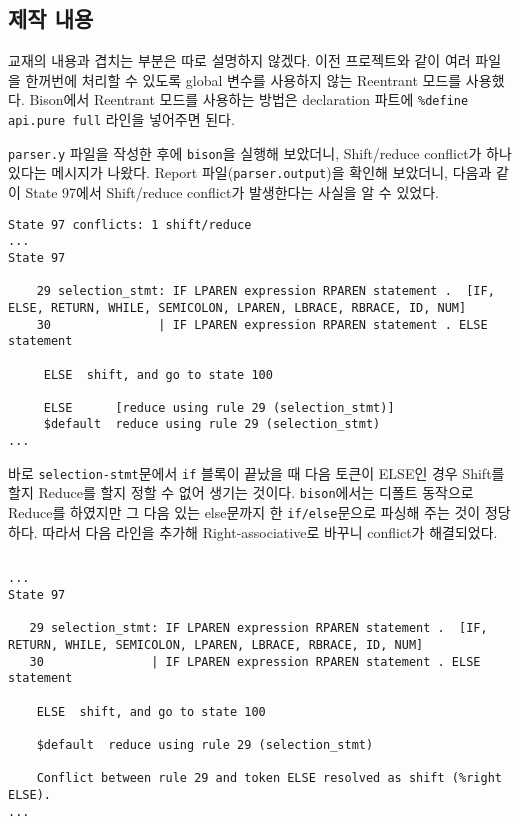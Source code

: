 \documentclass[a4paper, 10pt]{oblivoir}
\begin{document}
\subsection{제작 내용}
교재의 내용과 겹치는 부분은 따로 설명하지 않겠다.
이전 프로젝트와 같이 여러 파일을 한꺼번에 처리할 수 있도록 global 변수를 사용하지 않는 Reentrant 모드를 사용했다. Bison에서 Reentrant 모드를 사용하는 방법은 declaration 파트에 \texttt{\%define api.pure full} 라인을 넣어주면 된다.

\texttt{parser.y} 파일을 작성한 후에 \texttt{bison}을 실행해 보았더니, Shift/reduce conflict가 하나 있다는 메시지가 나왔다. Report 파일(\texttt{parser.output})을 확인해 보았더니, 다음과 같이 State 97에서 Shift/reduce conflict가 발생한다는 사실을 알 수 있었다.

\begin{lstlisting}[frame=single, caption=\texttt{parser.output}, breaklines=true]
State 97 conflicts: 1 shift/reduce
...
State 97
 
    29 selection_stmt: IF LPAREN expression RPAREN statement .  [IF, ELSE, RETURN, WHILE, SEMICOLON, LPAREN, LBRACE, RBRACE, ID, NUM]
    30               | IF LPAREN expression RPAREN statement . ELSE statement

     ELSE  shift, and go to state 100

     ELSE      [reduce using rule 29 (selection_stmt)]
     $default  reduce using rule 29 (selection_stmt) 
...
\end{lstlisting}

바로 \texttt{selection-stmt}문에서 \texttt{if} 블록이 끝났을 때 다음 토큰이 ELSE인 경우 Shift를 할지 Reduce를 할지 정할 수 없어 생기는 것이다. \texttt{bison}에서는 디폴트 동작으로 Reduce를 하였지만 그 다음 있는 else문까지 한 \texttt{if/else}문으로 파싱해 주는 것이 정당하다. 따라서 다음 라인을 추가해 Right-associative로 바꾸니 conflict가 해결되었다.

\begin{lstlisting}[frame=single]
%right RPAREN ELSE
\end{lstlisting}

\begin{lstlisting}[frame=single, caption=\texttt{parser.output} after \texttt{\%right} line added, breaklines=true]
...
State 97

   29 selection_stmt: IF LPAREN expression RPAREN statement .  [IF, RETURN, WHILE, SEMICOLON, LPAREN, LBRACE, RBRACE, ID, NUM]
   30               | IF LPAREN expression RPAREN statement . ELSE statement

    ELSE  shift, and go to state 100

    $default  reduce using rule 29 (selection_stmt)

    Conflict between rule 29 and token ELSE resolved as shift (%right ELSE).
...
\end{lstlisting}
\end{document}
